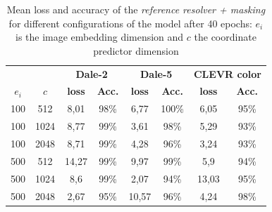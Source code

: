 \begin{table}[ht]
    \centering
    \begin{tabular}{cc|cc|cc|cc}
        \toprule
              &        & \multicolumn{2}{c}{\textbf{Dale-2}} & \multicolumn{2}{c}{\textbf{Dale-5}} & \multicolumn{2}{c}{\textbf{CLEVR color}}                                                 \\  \cmidrule(lr){3-4}\cmidrule(lr){5-6}\cmidrule(lr){7-8}
        $e_i$ & $c$    & \textbf{loss}                       & \textbf{Acc.}                       & \textbf{loss}                            & \textbf{Acc.} & \textbf{loss} & \textbf{Acc.} \\\midrule
        {100} & {512}  & {8,01}                              & {98\%}                              & {6,77}                                   & {100\%}       & {6,05}        & {95\%}        \\
        {100} & {1024} & {8,77}                              & {99\%}                              & {3,61}                                   & {98\%}        & {5,29}        & {93\%}        \\
        {100} & {2048} & {8,71}                              & {99\%}                              & {4,28}                                   & {96\%}        & {3,24}        & {93\%}        \\
        {500} & {512}  & {14,27}                             & {99\%}                              & {9,97}                                   & {99\%}        & {5,9}         & {94\%}        \\
        {500} & {1024} & {8,6}                               & {99\%}                              & {2,07}                                   & {94\%}        & {13,03}       & {95\%}        \\
        {500} & {2048} & {2,67}                              & {95\%}                              & {10,57}                                  & {96\%}        & {4,24}        & {98\%}        \\
        \bottomrule
    \end{tabular}
    \caption{Mean loss and accuracy of the \emph{reference resolver + masking} for different configurations of the model after 40 epochs: $e_i$ is the image embedding dimension and $c$ the coordinate predictor dimension}
    \label{tab:results:reference-resolver-masked}
\end{table}

